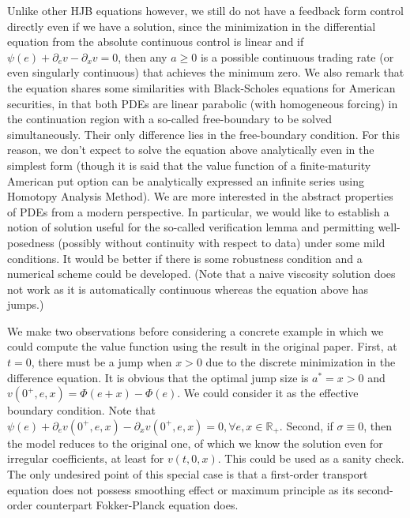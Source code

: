 \documentclass[openany,oneside]{article}
\theoremstyle{definition}
\theoremstyle{remark}
\begin{document}
{Unlike other HJB equations however, we still do not have a feedback form control directly even if we have a solution, since the minimization in the differential equation from the absolute continuous control is linear and if $\psi(e)+\partial_e v-\partial_x v=0$, then any $a\ge 0$ is a possible continuous trading rate (or even singularly continuous) that achieves the minimum zero. We also remark that the equation shares some similarities with Black-Scholes equations for American securities, in that both PDEs are linear parabolic (with homogeneous forcing) in the continuation region with a so-called free-boundary to be solved simultaneously. Their only difference lies in the free-boundary condition. For this reason, we don't expect to solve the equation above analytically even in the simplest form (though it is said that the value function of a finite-maturity American put option can be analytically expressed an infinite series using Homotopy Analysis Method). We are more interested in the abstract properties of PDEs from a modern perspective. In particular, we would like to establish a notion of solution useful for the so-called verification lemma and permitting well-posedness (possibly without continuity with respect to data) under some mild conditions. It would be better if there is some robustness condition and a numerical scheme could be developed. (Note that a naive viscosity solution does not work as it is automatically continuous whereas the equation above has jumps.)

We make two observations before considering a concrete example in which we could compute the value function using the result in the original paper. First, at $t=0$, there must be a jump when $x>0$ due to the discrete minimization in the difference equation. It is obvious that the optimal jump size is $a^\ast=x>0$ and $v(0^+,e,x)=\Phi(e+x)-\Phi(e)$. We could consider it as the effective boundary condition. Note that $\psi(e)+\partial_e v(0^+,e,x)-\partial_x v(0^+,e,x)=0, \forall e,x\in \mathbb{R}_+$. Second, if $\sigma\equiv 0$, then the model reduces to the original one, of which we know the solution even for irregular coefficients, at least for $v(t,0,x)$. This could be used as a sanity check. The only undesired point of this special case is that a first-order transport equation does not possess smoothing effect or maximum principle as its second-order counterpart Fokker-Planck equation does.

}
\end{document}
